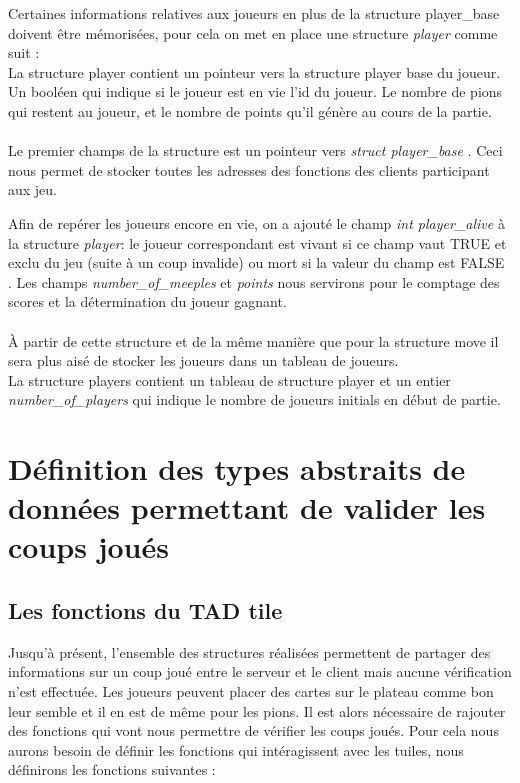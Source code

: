 \documentclass[12pt]{article}
\begin{document}
Certaines informations relatives aux joueurs en plus de la structure player\_base doivent être mémorisées, pour cela on met en place une structure \textit{player} comme suit :\\

La structure player contient un pointeur vers la structure player base du joueur. Un booléen qui indique si le joueur est en vie l'id du joueur. Le nombre de pions qui restent au joueur, et le nombre de points qu'il génère au cours de la partie.

\paragraph{} Le premier champs de la structure est un pointeur vers \textit{struct player\_base} . Ceci nous permet de stocker toutes les adresses des fonctions des clients participant aux jeu.

Afin de repérer les joueurs encore en vie, on a ajouté le champ \textit{int player\_alive} à la structure \textit{player}: le joueur correspondant est vivant si ce champ vaut TRUE et exclu du jeu (suite à un coup invalide) ou mort si la valeur du champ est FALSE . Les champs \textit{number\_of\_meeples} et \textit{points} nous servirons pour le comptage des scores et la détermination du joueur gagnant. 

\paragraph{} À partir de cette structure et de la même manière que pour la structure move il sera plus aisé de stocker les joueurs dans un tableau de joueurs.\\

La structure players contient un tableau de structure player et un entier \textit{number\_of\_players} qui indique le nombre de joueurs initials en début de partie.

\section{Définition des types abstraits de données permettant de valider les coups joués}

\subsection{Les fonctions du TAD tile}

Jusqu'à présent, l'ensemble des structures réalisées permettent de partager des informations sur un coup joué entre le serveur et le client mais aucune vérification n'est effectuée. Les joueurs peuvent placer des cartes sur le plateau comme bon leur semble et il en est de même pour les pions. Il est alors nécessaire de rajouter des fonctions qui vont nous permettre de vérifier les coups joués. Pour cela nous aurons besoin de définir les fonctions qui intéragissent avec les tuiles, nous définirons les fonctions suivantes : 
\end{document}

